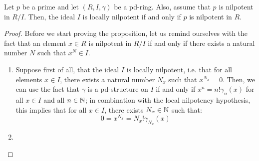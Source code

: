                 \begin{proposition} \label{prop: p_powers_in_PD_rings}
                    Let $p$ be a prime and let $(R, I , \gamma)$ be a pd-ring. Also, assume that $p$ is nilpotent in $R/I$. Then, the ideal $I$ is locally nilpotent if and only if $p$ is nilpotent in $R$. 
                \end{proposition}
                    \begin{proof}
                        Before we start proving the proposition, let us remind ourselves with the fact that an element $x \in R$ is nilpotent in $R/I$ if and only if there exists a natural number $N$ such that $x^N \in I$. 
                        \begin{enumerate}
                            \item Suppose first of all, that the ideal $I$ is locally nilpotent, i.e. that for all elements $x \in I$, there exists a natural number $N_x$ such that $x^{N_x} = 0$. Then, we can use the fact that $\gamma$ is a pd-structure on $I$ if and only if $x^n = n!\gamma_n(x)$ for all $x \in I$ and all $n \in \mathbb{N}$; in combination with the local nilpotency hypothesis, this implies that for all $x \in I$, there exists $N_x \in \mathbb{N}$ such that:
                                $$0 = x^{N_x} = N_x!\gamma_{N_x}(x)$$
                            \item
                        \end{enumerate}
                    \end{proof}
                    
